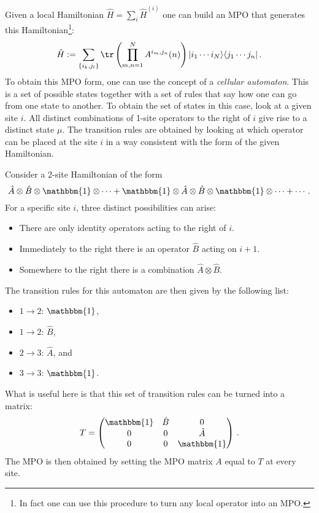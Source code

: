     \begin{method}
        Given a local Hamiltonian $\hat{H}=\sum_i\hat{H}^{(i)}$ one can build an MPO that generates this Hamiltonian\footnote{In fact one can use this procedure to turn any local operator into an MPO.}:
        \begin{gather}
            \hat{H} := \sum_{\{i_k,j_l\}}\tr\left(\prod_{m,n=1}^NA^{i_m,j_n}(n)\right)|i_1\cdots i_N\rangle\langle j_1\cdots j_n|\,.
        \end{gather}
        To obtain this MPO form, one can use the concept of a \textit{cellular automaton}. This is a set of possible states together with a set of rules that say how one can go from one state to another. To obtain the set of states in this case, look at a given site $i$. All distinct combinations of 1-site operators to the right of $i$ give rise to a distinct state $\mu$. The transition rules are obtained by looking at which operator can be placed at the site $i$ in a way consistent with the form of the given Hamiltonian.
    \end{method}
    \begin{example}
        Consider a 2-site Hamiltonian of the form \[\hat{A}\otimes\hat{B}\otimes\mathbbm{1}\otimes\cdots+\mathbbm{1}\otimes\hat{A}\otimes\hat{B}\otimes\mathbbm{1}\otimes\cdots+\cdots\,.\] For a specific site $i$, three distinct possibilities can arise:
        \begin{itemize}
            \item There are only identity operators acting to the right of $i$.
            \item Immediately to the right there is an operator $\hat{B}$ acting on $i+1$.
            \item Somewhere to the right there is a combination $\hat{A}\otimes\hat{B}$.
        \end{itemize}
        The transition rules for this automaton are then given by the following list:
        \begin{itemize}
            \item $1\rightarrow2$: $\mathbbm{1}$,
            \item $1\rightarrow2$: $\hat{B}$,
            \item $2\rightarrow3$: $\hat{A}$, and
            \item $3\rightarrow3$: $\mathbbm{1}$.
        \end{itemize}
        What is useful here is that this set of transition rules can be turned into a matrix: \[T=\begin{pmatrix}\mathbbm{1}&\hat{B}&0\\0&0&\hat{A}\\0&0&\mathbbm{1}\end{pmatrix}\,.\] The MPO is then obtained by setting the MPO matrix $A$ equal to $T$ at every site.
    \end{example}

